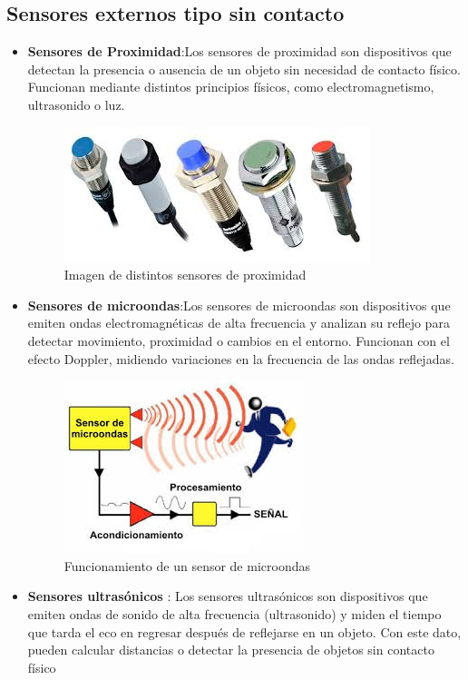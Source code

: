 \subsection{Sensores externos tipo sin contacto}
\begin{itemize}
	\item \textbf{Sensores de Proximidad}:Los sensores de proximidad son dispositivos que detectan la presencia o ausencia de un objeto sin necesidad de contacto físico. Funcionan mediante distintos principios físicos, como electromagnetismo, ultrasonido o luz.
	\begin{figure}[h]
		\centering
		\includegraphics[width=10 cm]{img/Sprox}
		\caption{Imagen de distintos sensores de proximidad}
		\label{fig:sprox}
	\end{figure}\newpage
	\item \textbf{Sensores de microondas}:Los sensores de microondas son dispositivos que emiten ondas electromagnéticas de alta frecuencia y analizan su reflejo para detectar movimiento, proximidad o cambios en el entorno. Funcionan con el efecto Doppler, midiendo variaciones en la frecuencia de las ondas reflejadas.
	\begin{figure}[h]
		\centering
		\includegraphics[width=6 cm]{img/smic}
		\caption{Funcionamiento de un sensor de microondas}
		\label{fig:smic}
	\end{figure}
	\item \textbf{Sensores ultrasónicos }: Los sensores ultrasónicos son dispositivos que emiten ondas de sonido de alta frecuencia (ultrasonido) y miden el tiempo que tarda el eco en regresar después de reflejarse en un objeto. Con este dato, pueden calcular distancias o detectar la presencia de objetos sin contacto físico

\end{itemize}
